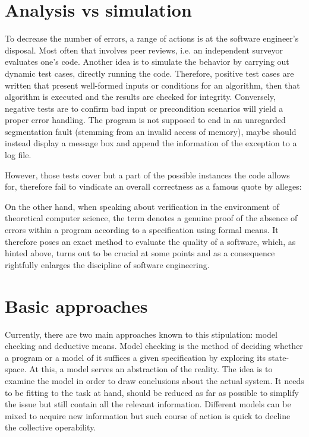 \section{Analysis vs simulation}
To decrease the number of errors, a range of actions is at the software engineer's disposal. Most often that involves peer reviews, i.e. an independent surveyor evaluates one's code. Another idea is to simulate the behavior by carrying out dynamic test cases, directly running the code. Therefore, positive test cases are written that present well-formed inputs or conditions for an algorithm, then that algorithm is executed and the results are checked for integrity. Conversely, negative tests are to confirm bad input or precondition scenarios will yield a proper error handling. The program is not supposed to end in an unregarded segmentation fault (stemming from an invalid access of memory), maybe should instead display a message box and append the information of the exception to a log file.

However, those tests cover but a part of the possible instances the code allows for, therefore fail to vindicate an overall correctness as a famous quote by  alleges:


On the other hand, when speaking about verification in the environment of theoretical computer science, the term denotes a genuine proof of the absence of errors within a program according to a specification using formal means. It therefore poses an exact method to evaluate the quality of a software, which, as hinted above, turns out to be crucial at some points and as a consequence rightfully enlarges the discipline of software engineering.

\section{Basic approaches}
Currently, there are two main approaches known to this stipulation: model checking and deductive means. Model checking is the method of deciding whether a program or a model of it suffices a given specification by exploring its state-space. At this, a model serves an abstraction of the reality. The idea is to examine the model in order to draw conclusions about the actual system. It needs to be fitting to the task at hand, should be reduced as far as possible to simplify the issue but still contain all the relevant information. Different models can be mixed to acquire new information but such course of action is quick to decline the collective operability.

